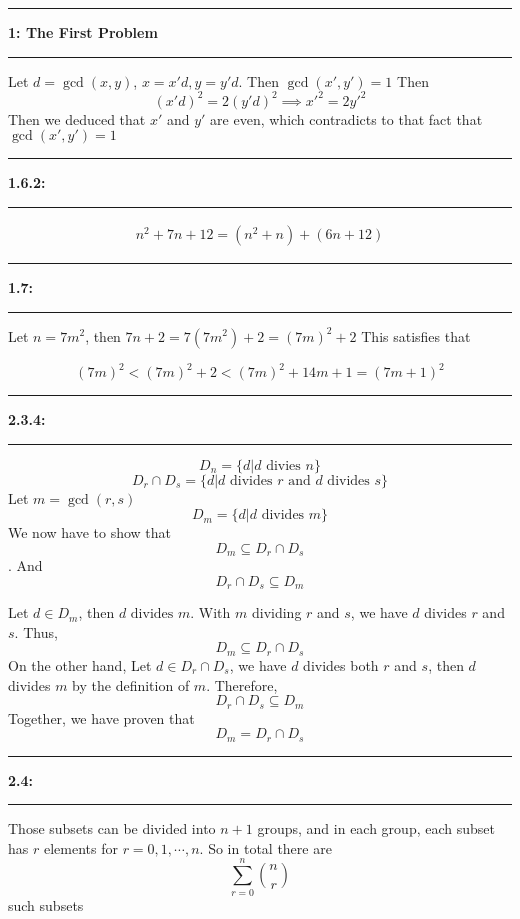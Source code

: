 \documentclass[11pt]{article}
\newcommand\question[2]{\vspace{.25in}\hrule\textbf{#1: #2}\vspace{.5em}\hrule\vspace{.10in}}
\begin{document}
\raggedright
\newcommand\NAME{Carl Kingsford}  %
\newcommand\ANDREWID{ckingsf}     %
\newcommand\HWNUM{1}              %
\newcommand\suminf{\sum_{n=0}^{\infty}}


\question{1}{The First Problem}

Let $d = \gcd(x,y)$, $x=x'd, y=y'd$. Then $\gcd(x', y') =1$ Then
\[(x'd)^2 = 2(y'd)^2\implies x'^2 = 2y'^2\]
Then we deduced that $x'$ and $y'$ are even, which contradicts to that fact that $\gcd(x',y')=1$

\question{1.6.2}{}
\begin{align*}
    n^2 + 7n + 12 = (n^2 + n) + (6n + 12)
\end{align*}

\question{1.7}{}
Let $n = 7m^2$, then $7n + 2 = 7(7m^2) + 2 = (7m)^2 + 2$
This satisfies that

\[(7m)^2< (7m)^2 + 2 < (7m)^2 + 14m + 1 = (7m+1)^2\]

\question{2.3.4}{}
\[D_n = \{d | d \text{ divies } n\}\]
\[D_r \cap D_s = \{d | d \text{ divides } r \text{ and } d \text{ divides } s\}\]
Let $m = \gcd(r, s)$
\[D_m = \{d | d \text{ divides } m\}\]
We now have to show that \[D_m \subseteq D_r \cap D_s\].
And
\[D_r \cap D_s \subseteq D_m\]

Let $d \in D_m$, then $d \text{ divides } m$. With $m$ dividing $r$ and $s$, we have $d$ divides $r$ and $s$.
Thus, 
\[D_m \subseteq D_r \cap D_s\]
On the other hand, Let $d \in D_r \cap D_s$, we have $d$ divides both $r$ and $s$, then $d$ divides $m$ by the definition of $m$.
Therefore, \[D_r \cap D_s \subseteq D_m\]
Together, we have proven that 
\[D_m = D_r \cap D_s\]
\pagebreak
\question{2.4}{}
Those subsets can be divided into $n + 1$ groups, and in each group, each subset has $r$ elements for $r = 0, 1, \cdots, n$.
So in total there are
\[\sum_{r=0}^{n}\binom{n}{r}\]
such subsets
\end{document}
